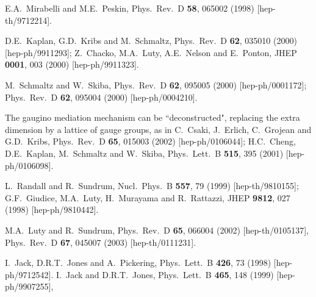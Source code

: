 \documentclass[12pt]{article}
\begin{document}
\begin{thebibliography}{999}
E.A.~Mirabelli and M.E.~Peskin,
  Phys.\ Rev.\ D {\bf 58}, 065002 (1998)
  [hep-th/9712214].

  D.E.~Kaplan, G.D.~Kribs and M.~Schmaltz,
  Phys.\ Rev.\ D {\bf 62}, 035010 (2000)
  [hep-ph/9911293];
  Z.~Chacko, M.A.~Luty, A.E.~Nelson and E.~Ponton,
  JHEP {\bf 0001}, 003 (2000)
  [hep-ph/9911323].

M.~Schmaltz and W.~Skiba,
  Phys.\ Rev.\ D {\bf 62}, 095005 (2000)
  [hep-ph/0001172];
  Phys.\ Rev.\ D {\bf 62}, 095004 (2000)
  [hep-ph/0004210].

The gaugino mediation mechanism can be ``deconstructed", replacing the
extra dimension by a lattice of gauge groups, as in
C.~Csaki, J.~Erlich, C.~Grojean and G.D.~Kribs,
  Phys.\ Rev.\ D {\bf 65}, 015003 (2002)
  [hep-ph/0106044];
H.C.~Cheng, D.E.~Kaplan, M.~Schmaltz and W.~Skiba,
  Phys.\ Lett.\ B {\bf 515}, 395 (2001)
  [hep-ph/0106098].

L.~Randall and R.~Sundrum,
  Nucl.\ Phys.\ B {\bf 557}, 79 (1999)
  [hep-th/9810155];
G.F.~Giudice, M.A.~Luty, H.~Murayama and R.~Rattazzi,
  JHEP {\bf 9812}, 027 (1998)
  [hep-ph/9810442].

M.A.~Luty and R.~Sundrum,
  Phys.\ Rev.\ D {\bf 65}, 066004 (2002)
  [hep-th/0105137],
  Phys.\ Rev.\ D {\bf 67}, 045007 (2003)
  [hep-th/0111231].
  
I.~Jack, D.R.T.~Jones and A.~Pickering,
  Phys.\ Lett.\ B {\bf 426}, 73 (1998)
  [hep-ph/9712542].
I.~Jack and D.R.T.~Jones,
  Phys.\ Lett.\ B {\bf 465}, 148 (1999)
  [hep-ph/9907255],


\end{thebibliography}
\end{document}
